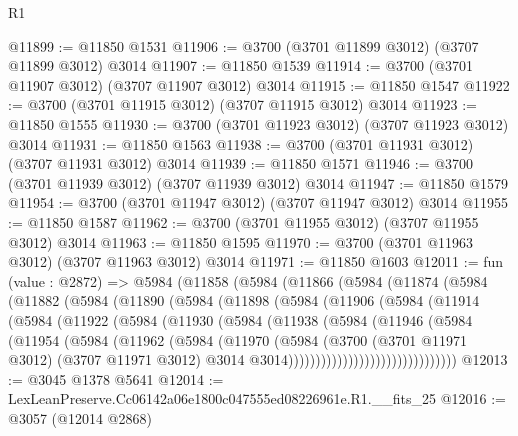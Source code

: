 \begin{lexlean}{R1}
\begin{coremodule}
@11899 := @11850 @1531
@11906 := @3700 (@3701 @11899 @3012) (@3707 @11899 @3012) @3014
@11907 := @11850 @1539
@11914 := @3700 (@3701 @11907 @3012) (@3707 @11907 @3012) @3014
@11915 := @11850 @1547
@11922 := @3700 (@3701 @11915 @3012) (@3707 @11915 @3012) @3014
@11923 := @11850 @1555
@11930 := @3700 (@3701 @11923 @3012) (@3707 @11923 @3012) @3014
@11931 := @11850 @1563
@11938 := @3700 (@3701 @11931 @3012) (@3707 @11931 @3012) @3014
@11939 := @11850 @1571
@11946 := @3700 (@3701 @11939 @3012) (@3707 @11939 @3012) @3014
@11947 := @11850 @1579
@11954 := @3700 (@3701 @11947 @3012) (@3707 @11947 @3012) @3014
@11955 := @11850 @1587
@11962 := @3700 (@3701 @11955 @3012) (@3707 @11955 @3012) @3014
@11963 := @11850 @1595
@11970 := @3700 (@3701 @11963 @3012) (@3707 @11963 @3012) @3014
@11971 := @11850 @1603
@12011 := fun (value : @2872) =>
  @5984
    (@11858
      (@5984
        (@11866
          (@5984
            (@11874
              (@5984
                (@11882
                  (@5984
                    (@11890
                      (@5984
                        (@11898
                          (@5984
                            (@11906
                              (@5984
                                (@11914
                                  (@5984
                                    (@11922
                                      (@5984
                                        (@11930
                                          (@5984
                                            (@11938
                                              (@5984
                                                (@11946
                                                  (@5984
                                                    (@11954
                                                      (@5984
                                                        (@11962
                                                          (@5984
                                                            (@11970
                                                              (@5984
                                                                (@3700
                                                                  (@3701 @11971 @3012)
                                                                  (@3707 @11971 @3012)
                                                                  @3014
                                                                  @3014)))))))))))))))))))))))))))))))
@12013 := @3045 @1378 @5641
@12014 := LexLeanPreserve.Cc06142a06e1800c047555ed08226961e.R1.__fits_25
@12016 := @3057 (@12014 @2868)

\end{coremodule}
\end{lexlean}
